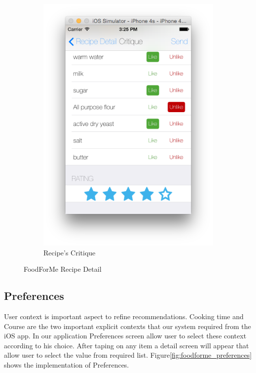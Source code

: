\begin{figure}[h]
\begin{subfigure}{.32\textwidth}
	  		\includegraphics[width=.9\linewidth]{figures/ch4_app_screen_shots/critique/critique_3.png}
	  		\caption{Recipe's Critique}
	  		\end{subfigure}
	  	\caption{FoodForMe Recipe Detail}
	  	\label{fig:foodforme_recpie_critiquing}
	  \end{figure}
\newpage
\subsection{Preferences} 

User context is important aspect to refine recommendations. Cooking time and Course are the two important explicit contexts that our system required from the iOS app.  In our application Preferences screen allow user to select these context according to his choice. After taping on any item a detail screen will appear that allow user to select the value from required list. Figure\ref{fig:foodforme_preferences} shows the implementation of Preferences. 

